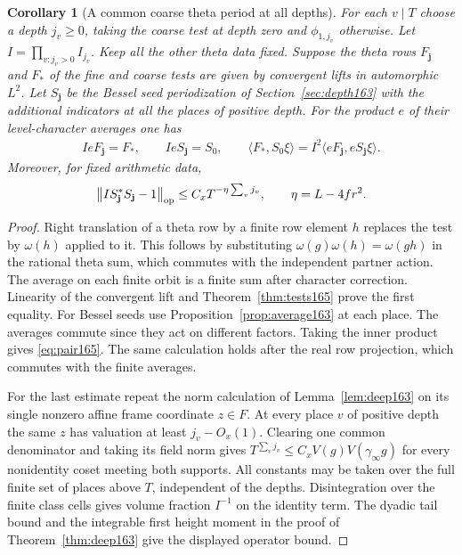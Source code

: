 \documentclass[a4paper,11pt]{article}
\newtheorem{corollary}[proposition]{Corollary}
\theoremstyle{definition}
\theoremstyle{remark}
\numberwithin{equation}{section}
\begin{document}
\begin{corollary}[A common coarse theta period at all depths]
\label{cor:trace165}
For each \(v\mid T\) choose a depth \(j_v\ge0\), taking the
coarse test at depth zero and \(\phi_{1,j_v}\) otherwise.
Let \(I=\prod_{v:j_v>0}I_{j_v}\). Keep all the other theta
data fixed. Suppose the theta rows \(F_{\mathbf j}\) and \(F_*\)
of the fine and coarse tests are given by convergent lifts in
automorphic \(L^2\). Let \(S_{\mathbf j}\) be the Bessel seed
periodization of Section~\ref{sec:depth163} with the additional
indicators at all the places of positive depth. For the product
\(e\) of their level-character averages one has
\begin{align}
    I e F_{\mathbf j}=F_* ,\qquad I e S_{\mathbf j}=S_0,\qquad
    \langle F_*,S_0\xi\rangle
            =I^2\langle eF_{\mathbf j},eS_{\mathbf j}\xi\rangle .
    \label{eq:pair165}
\end{align}
Moreover, for fixed arithmetic data,
\[
  \big\| I S_{\mathbf j}^* S_{\mathbf j}-1\big\|_{\rm op}
                \le C_x T^{-\eta\sum_v j_v},
               \qquad \eta=L-4fr^2 .
\]
\end{corollary}
\begin{proof}
Right translation of a theta row by a finite row element \(h\)
replaces the test by \(\omega(h)\) applied to it. This follows
by substituting \(\omega(g)\omega(h)=\omega(gh)\) in the
rational theta sum, which commutes with the independent
partner action. The average on each finite orbit is a finite
sum after character correction. Linearity of the convergent
lift and Theorem~\ref{thm:tests165} prove the first equality.
For Bessel seeds use Proposition~\ref{prop:average163} at
each place. The averages commute since they act on different
factors. Taking the inner product gives \eqref{eq:pair165}.
The same calculation holds after the real row projection,
which commutes with the finite averages.

For the last estimate repeat the norm calculation of
Lemma~\ref{lem:deep163} on its single nonzero affine frame
coordinate \(z\in F\). At every place \(v\) of positive depth
the same \(z\) has valuation at least \(j_v-O_x(1)\). Clearing
one common denominator and taking its field norm gives
\(T^{\sum_v j_v}\le C_x V(g)V(\gamma_\infty g)\) for every
nonidentity coset meeting both supports. All constants may be
taken over the full finite set of places above \(T\), independent
of the depths. Disintegration over the finite class cells gives
volume fraction \(I^{-1}\) on the identity term. The dyadic
tail bound and the integrable first height moment in the proof
of Theorem~\ref{thm:deep163} give the displayed operator bound.
\end{proof}
\end{document}
